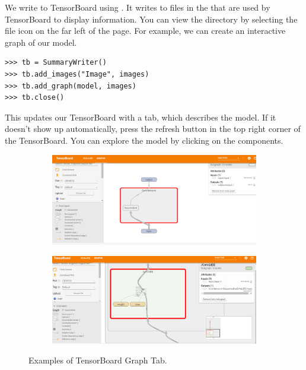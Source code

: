 We write to TensorBoard using .
It writes to files in the  that are used by TensorBoard to display information.
You can view the  directory by selecting the file icon on the far left of the page.
For example, we can create an interactive graph of our model.

\begin{lstlisting}
>>> tb = SummaryWriter()
>>> tb.add_images("Image", images)
>>> tb.add_graph(model, images)
>>> tb.close()
\end{lstlisting}

This updates our TensorBoard with a  tab, which describes the model.
If it doesn't show up automatically, press the refresh button in the top right corner of the TensorBoard.
You can explore the model by clicking on the components.
\begin{figure}[H] %
    \centering
    \begin{subfigure}{.66\textwidth}
        \includegraphics[width=\textwidth]{figures/net1.png}
    \end{subfigure}
    \begin{subfigure}{.66\textwidth}
        \includegraphics[width=\textwidth]{figures/net2.png}
    \end{subfigure}

\caption{Examples of TensorBoard Graph Tab.}
\label{fig:graphs}
\end{figure}

